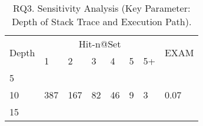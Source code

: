 \begin{table}[h]
	\caption{RQ3. Sensitivity Analysis (Key Parameter: Depth of Stack Trace and Execution Path).}
	{\small
		\begin{center}
			\renewcommand{\arraystretch}{1}
			\begin{tabular}{p{1cm}|p{0.3cm}<{\centering}|p{0.3cm}<{\centering}|p{0.3cm}<{\centering}|p{0.3cm}<{\centering}|p{0.3cm}<{\centering}|p{0.3cm}<{\centering}|p{0.7cm}<{\centering}}
				\hline
				\multirow{2}{*}{Depth}    & \multicolumn{6}{c|}{Hit-n@Set}& \multirow{2}{*}{EXAM}\\
				\cline{2-7}
				&1&2&3&4&5&5+&\\
				
				\hline 
				5 			                &  &  &   &  &  &    & \\
				10                          & 387 & 167 & 82  & 46 & 9 & 3   & 0.07\\
				15	                        &  &  &   &  &  &    & \\
				\hline
			\end{tabular}
			
			\label{fig:rq3-2}
		\end{center}
	}
\end{table}